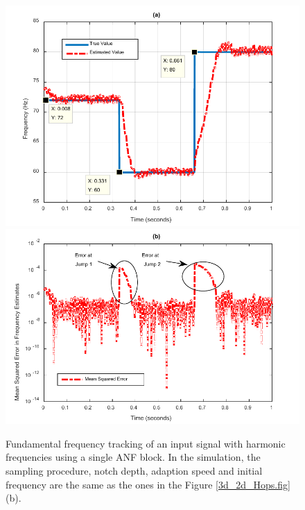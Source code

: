 \documentclass{UCF_ETD}
\begin{document}
 \begin{figure}[H]
 \begin{center}
 \includegraphics[scale=0.9]{NonuniformANF/Figure20a} %
 \includegraphics[scale=0.9]{NonuniformANF/Figure20b} %
 \caption{Fundamental frequency tracking of an input signal with harmonic frequencies using a single ANF block.
 In the simulation, the sampling procedure, notch depth, adaption speed and initial frequency
  are the same as the ones in the Figure \ref{3d_2d_Hops.fig}(b).
 }
 \label{HarmonicSolution}
 \end{center}
 \end{figure}
\end{document}
